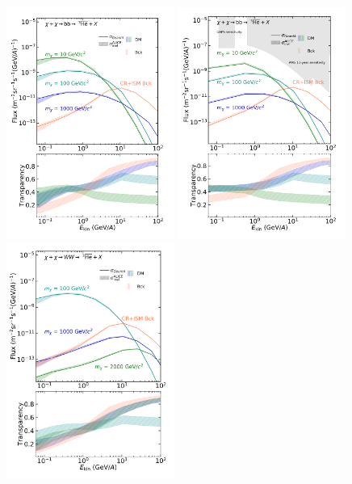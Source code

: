 \begin{figure}[hbtp]
    \centering
    \includegraphics[width=0.49\textwidth]{figures/he3bar_bb_LIS.png}
    \includegraphics[width=0.49\textwidth]{figures/he3bar_bb_SM.png}
    \includegraphics[width=0.49\textwidth]{figures/he3bar_WW_LIS.png}

\end{figure}
